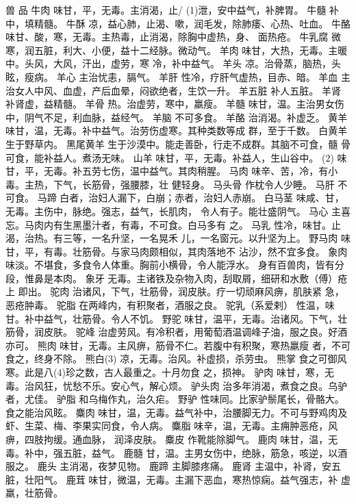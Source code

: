 \documentclass[12pt,UTF8]{ctexbook}
\begin{document}
兽 品
牛肉 味甘，平，无毒。主消渴，止/
(1)泄，安中益气，补脾胃。
牛髓 补中，填精髓。
牛酥 凉，益心肺，止渴、嗽，润毛发，除肺痿、心热、吐血。
牛酪 味甘、酸，寒，无毒。主热毒，止消渴，除胸中虚热，身、
面热疮。
牛乳腐 微寒，润五脏，利大、小便，益十二经脉。微动气。
羊肉 味甘，大热，无毒。主暖中。头风，大风，汗出，虚劳，寒
冷，补中益气。
羊头 凉。治骨蒸，脑热，头眩，瘦病。
羊心 主治忧恚，膈气。
羊肝 性冷，疗肝气虚热，目赤、暗。
羊血 主治女人中风、血虚，产后血晕，闷欲绝者，生饮一升。
羊五脏 补人五脏。
羊肾 补肾虚，益精髓。
羊骨 热。治虚劳，寒中，羸瘦。
羊髓 味甘，温。主治男女伤中，阴气不足，利血脉，益经气。
羊脑 不可多食。
羊酪 治消渴。补虚乏。
黄羊 味甘，温，无毒。补中益气。治劳伤虚寒。其种类数等成
群，至于千数。
白黄羊 生于野草内。
黑尾黄羊 生于沙漠中。能走善卧，行走不成群。其脑不可食，髓
骨可食，能补益人。煮汤无味。
山羊 味甘，平，无毒。补益人，生山谷中。
(2) 味甘，平，无毒。补五劳七伤，温中益气。其肉稍腥。
马肉 味辛、苦，冷，有小毒。主热，下气，长筋骨，强腰膝，壮
健轻身。
马头骨 作枕令人少睡。
马肝 不可食。
马蹄 白者，治妇人漏下，白崩；赤者，治妇人赤崩。
白马茎 味咸、甘，无毒。主伤中，脉绝。强志，益气，长肌肉，
令人有子。能壮盛阴气。
马心 主喜忘。马肉内有生黑墨汁者，有毒，不可食。白马多有
之。
马乳 性冷，味甘。止渴，治热。有三等，一名升坚，一名晃禾
儿，一名窗元。以升坚为上。
野马肉 味甘，平，有毒。壮筋骨。与家马肉颇相似，其肉落地不
沾沙，然不宜多食。
象肉 味淡。不堪食，多食令人体重。胸前小横骨，令人能浮水。
身有百兽肉，皆有分段，惟鼻是本肉。
象牙 无毒。主诸铁及杂物入肉，刮取屑，细研和水敷（傅）疮上
即出。
驼肉 治诸风，下气，壮筋骨，润皮肤。疗一切顽麻风痹，肌肤紧
急，恶疮肿毒。
驼脂 在两峰内，有积聚者，酒服之良。
驼乳（系爱剌） 性温，味甘。补中益气，壮筋骨。令人不饥。
野驼 味甘，温平，无毒。治诸风。下气，壮筋骨，润皮肤。
驼峰 治虚劳风。有冷积者，用葡萄酒温调峰子油，服之良。好酒
亦可。
熊肉 味甘，无毒。主风痹，筋骨不仁。若腹中有积聚，寒热羸瘦
者，不可食之，终身不除。
熊白(3) 凉，无毒。治风。补虚损，杀劳虫。
熊掌 食之可御风寒。此是八(4)珍之数，古人最重之。十月勿食
之，损神。
驴肉 味甘，寒，无毒。治风狂，忧愁不乐。安心气，解心烦。
驴头肉 治多年消渴，煮食之良。乌驴者，尤佳。
驴脂 和乌梅作丸，治久疟。
野驴 性味同。比家驴鬃尾长，骨骼大。食之能治风眩。
麋肉 味甘，温，无毒。益气补中，治腰脚无力。不可与野鸡肉及
虾、生菜、梅、李果实同食，令人病。
麋脂 味辛，温，无毒。主痈肿恶疮，风痹，四肢拘缓。通血脉，
润泽皮肤。
麋皮 作靴能除脚气。
鹿肉 味甘，温，无毒。补中，强五脏，益气。
鹿髓 甘，温。主男女伤中，绝脉，筋急，咳逆，以酒服之。
鹿头 主消渴，夜梦见物。
鹿蹄 主脚膝疼痛。
鹿肾 主温中，补肾，安五脏，壮阳气。
鹿茸 味甘，微温，无毒。主漏下恶血，寒热惊痫。益气强志，补
虚羸，壮筋骨。
\end{document}
